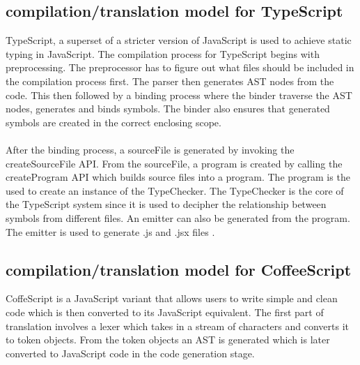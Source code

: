 \subsection{compilation/translation model for TypeScript}
TypeScript, a superset of a stricter version of JavaScript is used to achieve static typing in JavaScript. The compilation process for TypeScript begins with preprocessing. The preprocessor has to figure out what files should be included in the compilation process first. The parser then generates AST nodes from the code. This then followed by a binding process where the binder traverse the AST nodes, generates and binds symbols. The binder also ensures that generated symbols are created in the correct enclosing scope.
\paragraph{}
After the binding process, a sourceFile is generated by invoking the createSourceFile API. From the sourceFile, a program is created by calling the createProgram API which builds source files into a program. The program is the used to create an instance of the TypeChecker. The TypeChecker is the core of the TypeScript system since it is used to decipher the relationship between symbols from different files. An emitter can also be generated from the program. The  emitter is used to generate .js and .jsx files \cite{typescript}.

\subsection{compilation/translation model for CoffeeScript}
CoffeScript is a JavaScript variant that allows users to write simple and clean code which is then converted to its JavaScript equivalent. The first part of translation involves a lexer which takes in a stream of characters and converts it to token objects. From the token objects an AST is generated which is later converted to JavaScript code in the code generation stage.


